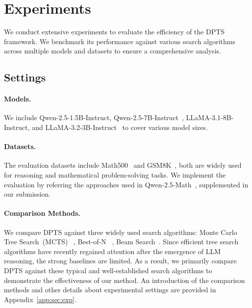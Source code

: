 
\section{Experiments}
\label{sec:exp}
We conduct extensive experiments to evaluate the efficiency of the DPTS framework. We benchmark its performance against various search algorithms across multiple models and datasets to ensure a comprehensive analysis.


\subsection{Settings}
\label{sec:exp_setting}

\paragraph{Models.} We include Qwen-2.5-1.5B-Instruct, Qwen-2.5-7B-Instruct~\cite{yang2024qwen2}, LLaMA-3.1-8B-Instruct, and LLaMA-3.2-3B-Instruct~\cite{touvron2023llama} to cover various model sizes.  

\paragraph{Datasets.} The evaluation datasets include Math500~\cite{hendrycks2021measuring} and GSM8K~\cite{cobbe2021training}, both are widely used for reasoning and mathematical problem-solving tasks. We implement the evaluation by referring the approaches used in Qwen-2.5-Math~\cite{yang2024qwen2}, supplemented in our submission. 

\paragraph{Comparison Methods.} We compare DPTS against three widely used search algorithms: Monte Carlo Tree Search~(MCTS)~\cite{sprueill2023monte}
, Best-of-N~\cite{cobbe2021training}
, Beam Search~\cite{Yao_2023_Tree}.
Since efficient tree search algorithms have recently regained attention after the emergence of LLM reasoning, the strong baselines are limited. As a result, we primarily compare DPTS against these typical and well-established search algorithms to demonstrate the effectiveness of our method. An introduction of the comparison methods and other details about experimental settings are provided in Appendix~\ref{app:sec:exp}.

